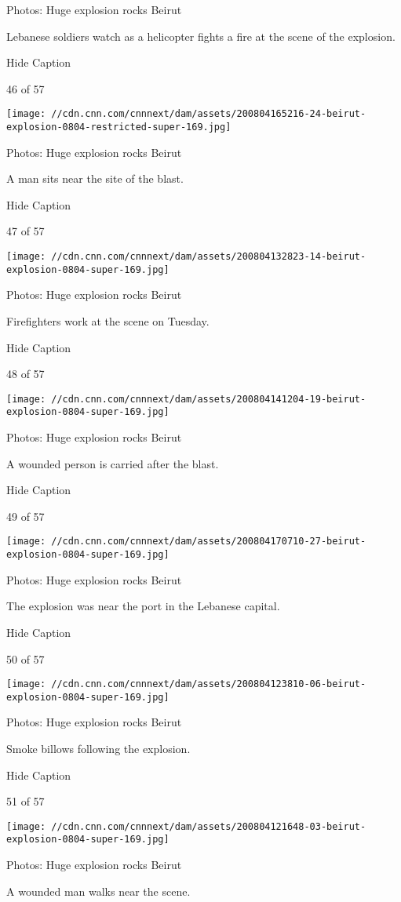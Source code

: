 Photos: Huge explosion rocks Beirut

Lebanese soldiers watch as a helicopter fights a fire at the scene of
the explosion.

Hide Caption

46 of 57

\texttt{[image: //cdn.cnn.com/cnnnext/dam/assets/200804165216-24-beirut-explosion-0804-restricted-super-169.jpg]}

Photos: Huge explosion rocks Beirut

A man sits near the site of the blast.

Hide Caption

47 of 57

\texttt{[image: //cdn.cnn.com/cnnnext/dam/assets/200804132823-14-beirut-explosion-0804-super-169.jpg]}

Photos: Huge explosion rocks Beirut

Firefighters work at the scene on Tuesday.

Hide Caption

48 of 57

\texttt{[image: //cdn.cnn.com/cnnnext/dam/assets/200804141204-19-beirut-explosion-0804-super-169.jpg]}

Photos: Huge explosion rocks Beirut

A wounded person is carried after the blast.

Hide Caption

49 of 57

\texttt{[image: //cdn.cnn.com/cnnnext/dam/assets/200804170710-27-beirut-explosion-0804-super-169.jpg]}

Photos: Huge explosion rocks Beirut

The explosion was near the port in the Lebanese capital.

Hide Caption

50 of 57

\texttt{[image: //cdn.cnn.com/cnnnext/dam/assets/200804123810-06-beirut-explosion-0804-super-169.jpg]}

Photos: Huge explosion rocks Beirut

Smoke billows following the explosion.

Hide Caption

51 of 57

\texttt{[image: //cdn.cnn.com/cnnnext/dam/assets/200804121648-03-beirut-explosion-0804-super-169.jpg]}

Photos: Huge explosion rocks Beirut

A wounded man walks near the scene.

